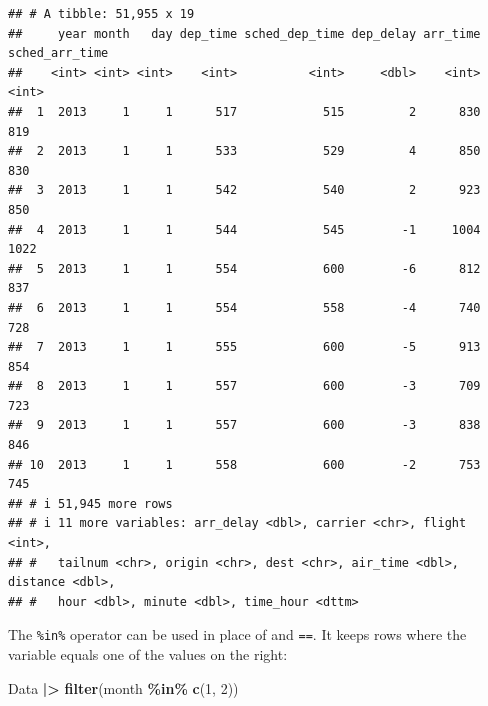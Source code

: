 \documentclass[
]{book}
\newenvironment{Shaded}{\begin{snugshade}}{\end{snugshade}}
\newcommand{\DecValTok}[1]{\textcolor[rgb]{0.00,0.00,0.81}{#1}}
\newcommand{\FunctionTok}[1]{\textcolor[rgb]{0.13,0.29,0.53}{\textbf{#1}}}
\newcommand{\NormalTok}[1]{#1}
\newcommand{\SpecialCharTok}[1]{\textcolor[rgb]{0.81,0.36,0.00}{\textbf{#1}}}
\theoremstyle{definition}
\theoremstyle{definition}
\theoremstyle{definition}
\theoremstyle{definition}
\theoremstyle{remark}
\begin{document}
\begin{verbatim}
## # A tibble: 51,955 x 19
##     year month   day dep_time sched_dep_time dep_delay arr_time sched_arr_time
##    <int> <int> <int>    <int>          <int>     <dbl>    <int>          <int>
##  1  2013     1     1      517            515         2      830            819
##  2  2013     1     1      533            529         4      850            830
##  3  2013     1     1      542            540         2      923            850
##  4  2013     1     1      544            545        -1     1004           1022
##  5  2013     1     1      554            600        -6      812            837
##  6  2013     1     1      554            558        -4      740            728
##  7  2013     1     1      555            600        -5      913            854
##  8  2013     1     1      557            600        -3      709            723
##  9  2013     1     1      557            600        -3      838            846
## 10  2013     1     1      558            600        -2      753            745
## # i 51,945 more rows
## # i 11 more variables: arr_delay <dbl>, carrier <chr>, flight <int>,
## #   tailnum <chr>, origin <chr>, dest <chr>, air_time <dbl>, distance <dbl>,
## #   hour <dbl>, minute <dbl>, time_hour <dttm>
\end{verbatim}

The \texttt{\%in\%} operator can be used in place of \texttt{\textbar{}} and \texttt{==}. It keeps rows where the variable equals one of the values on the right:

\begin{Shaded}
\begin{Highlighting}[]
\NormalTok{Data }\SpecialCharTok{|\textgreater{}} 
  \FunctionTok{filter}\NormalTok{(month }\SpecialCharTok{\%in\%} \FunctionTok{c}\NormalTok{(}\DecValTok{1}\NormalTok{, }\DecValTok{2}\NormalTok{))}
\end{Highlighting}
\end{Shaded}
\end{document}
